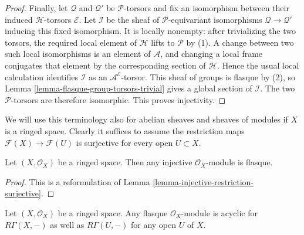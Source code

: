 \begin{proof}
Finally, let $\mathcal Q$ and $\mathcal Q'$ be $\mathcal P$-torsors and
fix an isomorphism between their induced $\mathcal H$-torsors
$\mathcal E$. Let $\mathcal I$ be the sheaf of
$\mathcal P$-equivariant isomorphisms
$\mathcal Q\to\mathcal Q'$ inducing this fixed isomorphism. It is locally
nonempty: after trivializing the two torsors, the required local element
of $\mathcal H$ lifts to $\mathcal P$ by (1). A change between two such
local isomorphisms is an element of $\mathcal A$, and changing a local
frame conjugates that element by the corresponding section of
$\mathcal H$. Hence the usual local calculation identifies $\mathcal I$
as an $\mathcal A^{\mathcal E}$-torsor. This sheaf of groups is flasque
by (2), so Lemma \ref{lemma-flasque-group-torsors-trivial} gives a global
section of $\mathcal I$. The two $\mathcal P$-torsors are therefore
isomorphic. This proves injectivity.
\end{proof}

\noindent
We will use this terminology also for abelian sheaves and
sheaves of modules if $X$ is a ringed space.
Clearly it suffices to assume the restriction maps
$\mathcal{F}(X) \to \mathcal{F}(U)$ is surjective for every
open $U \subset X$.

\begin{lemma}
\label{lemma-injective-flasque}
Let $(X, \mathcal{O}_X)$ be a ringed space.
Then any injective $\mathcal{O}_X$-module is flasque.
\end{lemma}

\begin{proof}
This is a reformulation of Lemma \ref{lemma-injective-restriction-surjective}.
\end{proof}

\begin{lemma}
\label{lemma-flasque-acyclic}
Let $(X, \mathcal{O}_X)$ be a ringed space. Any flasque $\mathcal{O}_X$-module
is acyclic for $R\Gamma(X, -)$ as well as $R\Gamma(U, -)$ for any
open $U$ of $X$.
\end{lemma}

